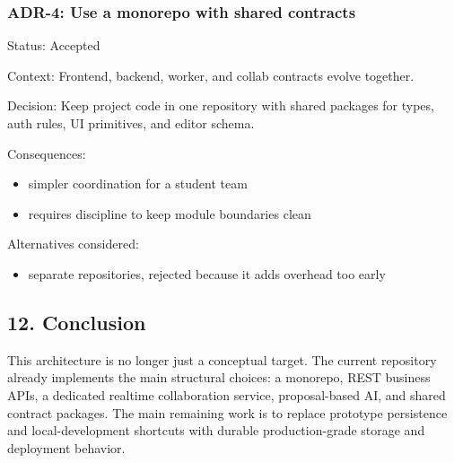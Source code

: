 \documentclass[a4paper]{article}
\providecommand{\tightlist}{%
  \setlength{\itemsep}{0pt}\setlength{\parskip}{0pt}}
\begin{document}
\subsubsection{ADR-4: Use a monorepo with shared
contracts}\label{adr-4-use-a-monorepo-with-shared-contracts}

Status: Accepted

Context: Frontend, backend, worker, and collab contracts evolve
together.

Decision: Keep project code in one repository with shared packages for
types, auth rules, UI primitives, and editor schema.

Consequences:

\begin{itemize}
\tightlist
\item
  simpler coordination for a student team
\item
  requires discipline to keep module boundaries clean
\end{itemize}

Alternatives considered:

\begin{itemize}
\tightlist
\item
  separate repositories, rejected because it adds overhead too early
\end{itemize}

\subsection{12. Conclusion}\label{12-conclusion}

This architecture is no longer just a conceptual target. The current
repository already implements the main structural choices: a monorepo,
REST business APIs, a dedicated realtime collaboration service,
proposal-based AI, and shared contract packages. The main remaining work
is to replace prototype persistence and local-development shortcuts with
durable production-grade storage and deployment behavior.
\end{document}
